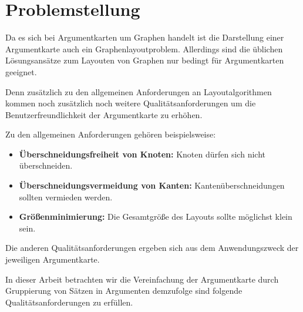 

\chapter{Problemstellung}
Da es sich bei Argumentkarten um Graphen handelt ist die Darstellung einer Argumentkarte auch ein Graphenlayoutproblem. Allerdings sind die üblichen Lösungsansätze zum Layouten von Graphen nur bedingt für Argumentkarten geeignet.

Denn zusätzlich zu den allgemeinen Anforderungen an Layoutalgorithmen kommen noch zusätzlich noch weitere Qualitätsanforderungen um die Benutzerfreundlichkeit der Argumentkarte zu erhöhen.

Zu den allgemeinen Anforderungen gehören beispielsweise:

\begin{itemize}
\item {\bf{Überschneidungsfreiheit von Knoten:}} \newline Knoten dürfen sich nicht überschneiden.
\item {\bf{Überschneidungsvermeidung von Kanten:}}  \newline Kantenüberschneidungen sollten vermieden werden.
\item {\bf{Größenminimierung:}} \newline Die Gesamtgröße des Layouts sollte möglichst klein sein.
\end{itemize}

Die anderen Qualitätsanforderungen ergeben sich aus dem Anwendungszweck der jeweiligen Argumentkarte.

In dieser Arbeit betrachten wir die Vereinfachung der Argumentkarte durch Gruppierung von Sätzen in Argumenten demzufolge sind folgende Qualitätsanforderungen zu erfüllen.



